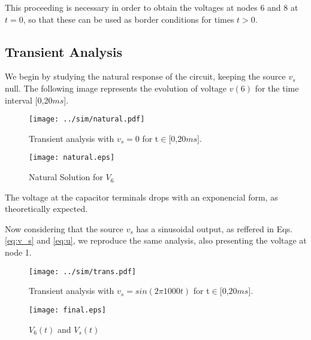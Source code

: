 \par This proceeding is necessary in order to obtain the voltages at nodes 6 and 8 at $t=0$, so that these can be used as border conditions for times $t>0$. 

\subsection{Transient Analysis}

\par We begin by studying the natural response of the circuit, keeping the source $v_s$ null. The following image represents the evolution of voltage $v(6)$ for the time interval [0,20$ms$].

\begin{figure}[H]
  \centering
  \texttt{[image: ../sim/natural.pdf]}
  \caption{Transient analysis with $v_s =0$ for t$\in$[$0$,$20ms$].}
  \label{fig:sim_1}
\end{figure}


\begin{figure}[H]
  \centering
  \texttt{[image: natural.eps]}
  \caption{Natural Solution for $V_{6}$}
  \label{fig:OctaveNaturalSolution_2}
\end{figure}


The voltage at the capacitor terminals drops with an exponencial form, as theoretically expected.

\par Now considering that the source $v_s$ has a sinusoidal output, as reffered in Eqs. \ref{eq:v_s} and \ref{eq:u}, we reproduce the same analysis, also presenting the voltage at node 1.

\begin{figure}[H]
  \centering
  \texttt{[image: ../sim/trans.pdf]}
  \caption{Transient analysis with $v_s = sin(2\pi 1000 t)$ for t$\in$[$0$,$20ms$].}
  \label{fig:sim_2}
\end{figure}


\begin{figure}[H]
  \centering
  \texttt{[image: final.eps]}
  \caption{$V_6(t)$ and $V_s(t)$}
  \label{fig:OctaveFinalSolution}
\end{figure}



